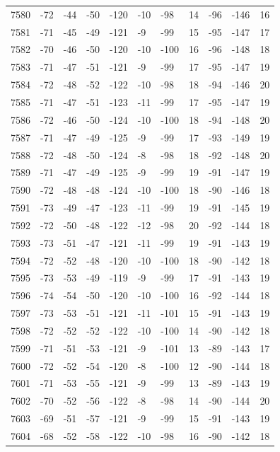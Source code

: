 \begin{table}[H]
\begin{tabular}{lllllllllll}
7580 & -72 & -44 & -50 & -120 & -10 & -98 & 14 & -96 & -146 & 16 \\
7581 & -71 & -45 & -49 & -121 & -9 & -99 & 15 & -95 & -147 & 17 \\
7582 & -70 & -46 & -50 & -120 & -10 & -100 & 16 & -96 & -148 & 18 \\
7583 & -71 & -47 & -51 & -121 & -9 & -99 & 17 & -95 & -147 & 19 \\
7584 & -72 & -48 & -52 & -122 & -10 & -98 & 18 & -94 & -146 & 20 \\
7585 & -71 & -47 & -51 & -123 & -11 & -99 & 17 & -95 & -147 & 19 \\
7586 & -72 & -46 & -50 & -124 & -10 & -100 & 18 & -94 & -148 & 20 \\
7587 & -71 & -47 & -49 & -125 & -9 & -99 & 17 & -93 & -149 & 19 \\
7588 & -72 & -48 & -50 & -124 & -8 & -98 & 18 & -92 & -148 & 20 \\
7589 & -71 & -47 & -49 & -125 & -9 & -99 & 19 & -91 & -147 & 19 \\
7590 & -72 & -48 & -48 & -124 & -10 & -100 & 18 & -90 & -146 & 18 \\
7591 & -73 & -49 & -47 & -123 & -11 & -99 & 19 & -91 & -145 & 19 \\
7592 & -72 & -50 & -48 & -122 & -12 & -98 & 20 & -92 & -144 & 18 \\
7593 & -73 & -51 & -47 & -121 & -11 & -99 & 19 & -91 & -143 & 19 \\
7594 & -72 & -52 & -48 & -120 & -10 & -100 & 18 & -90 & -142 & 18 \\
7595 & -73 & -53 & -49 & -119 & -9 & -99 & 17 & -91 & -143 & 19 \\
7596 & -74 & -54 & -50 & -120 & -10 & -100 & 16 & -92 & -144 & 18 \\
7597 & -73 & -53 & -51 & -121 & -11 & -101 & 15 & -91 & -143 & 19 \\
7598 & -72 & -52 & -52 & -122 & -10 & -100 & 14 & -90 & -142 & 18 \\
7599 & -71 & -51 & -53 & -121 & -9 & -101 & 13 & -89 & -143 & 17 \\
7600 & -72 & -52 & -54 & -120 & -8 & -100 & 12 & -90 & -144 & 18 \\
7601 & -71 & -53 & -55 & -121 & -9 & -99 & 13 & -89 & -143 & 19 \\
7602 & -70 & -52 & -56 & -122 & -8 & -98 & 14 & -90 & -144 & 20 \\
7603 & -69 & -51 & -57 & -121 & -9 & -99 & 15 & -91 & -143 & 19 \\
7604 & -68 & -52 & -58 & -122 & -10 & -98 & 16 & -90 & -142 & 18 \\

\end{tabular}
\end{table}
